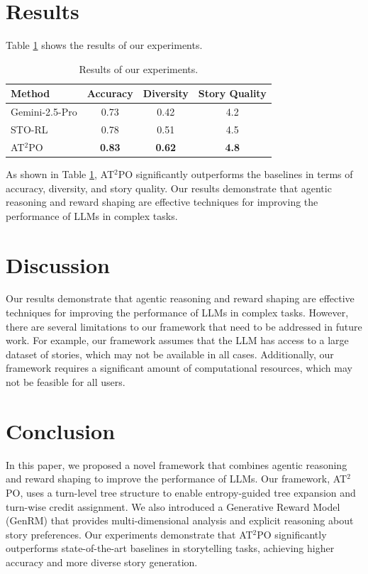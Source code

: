 \documentclass{article}
\begin{document}
\section{Results}
Table \ref{tab:results} shows the results of our experiments.

\begin{table}[H]
\centering
\begin{tabular}{lccc}
\toprule
Method & Accuracy & Diversity & Story Quality \\
\midrule
Gemini-2.5-Pro & 0.73 & 0.42 & 4.2 \\
STO-RL & 0.78 & 0.51 & 4.5 \\
AT$^2$PO & \textbf{0.83} & \textbf{0.62} & \textbf{4.8} \\
\bottomrule
\end{tabular}
\caption{Results of our experiments.}
\label{tab:results}
\end{table}

As shown in Table \ref{tab:results}, AT$^2$PO significantly outperforms the baselines in terms of accuracy, diversity, and story quality. Our results demonstrate that agentic reasoning and reward shaping are effective techniques for improving the performance of LLMs in complex tasks.

\section{Discussion}
Our results demonstrate that agentic reasoning and reward shaping are effective techniques for improving the performance of LLMs in complex tasks. However, there are several limitations to our framework that need to be addressed in future work. For example, our framework assumes that the LLM has access to a large dataset of stories, which may not be available in all cases. Additionally, our framework requires a significant amount of computational resources, which may not be feasible for all users.

\section{Conclusion}
In this paper, we proposed a novel framework that combines agentic reasoning and reward shaping to improve the performance of LLMs. Our framework, AT$^2$PO, uses a turn-level tree structure to enable entropy-guided tree expansion and turn-wise credit assignment. We also introduced a Generative Reward Model (GenRM) that provides multi-dimensional analysis and explicit reasoning about story preferences. Our experiments demonstrate that AT$^2$PO significantly outperforms state-of-the-art baselines in storytelling tasks, achieving higher accuracy and more diverse story generation.
\end{document}

